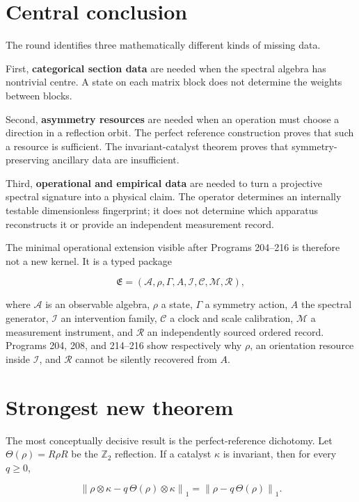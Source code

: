 \documentclass[11pt,a4paper,openany]{report}
\begin{document}
\section{Central conclusion}

The round identifies three mathematically different kinds of missing data.

First, \textbf{categorical section data} are needed when the spectral algebra has nontrivial centre. A state on each matrix block does not determine the weights between blocks.

Second, \textbf{asymmetry resources} are needed when an operation must choose a direction in a reflection orbit. The perfect reference construction proves that such a resource is sufficient. The invariant-catalyst theorem proves that symmetry-preserving ancillary data are insufficient.

Third, \textbf{operational and empirical data} are needed to turn a projective spectral signature into a physical claim. The operator determines an internally testable dimensionless fingerprint; it does not determine which apparatus reconstructs it or provide an independent measurement record.

The minimal operational extension visible after Programs 204--216 is therefore not a new kernel. It is a typed package

\[
\mathfrak E=
(\mathcal A,\rho,\Gamma,A,\mathcal I,\mathcal C,\mathcal M,\mathcal R),
\]

where \(\mathcal A\) is an observable algebra, \(\rho\) a state, \(\Gamma\) a symmetry action, \(A\) the spectral generator, \(\mathcal I\) an intervention family, \(\mathcal C\) a clock and scale calibration, \(\mathcal M\) a measurement instrument, and \(\mathcal R\) an independently sourced ordered record. Programs 204, 208, and 214--216 show respectively why \(\rho\), an orientation resource inside \(\mathcal I\), and \(\mathcal R\) cannot be silently recovered from \(A\).

\section{Strongest new theorem}

The most conceptually decisive result is the perfect-reference dichotomy. Let \(\Theta(\rho)=R\rho R\) be the \(\mathbb Z_2\) reflection. If a catalyst \(\kappa\) is invariant, then for every \(q\ge0\),

\[
\left\|
\rho\otimes\kappa-q\,\Theta(\rho)\otimes\kappa
\right\|_1
=
\left\|\rho-q\,\Theta(\rho)\right\|_1.
\]
\end{document}
